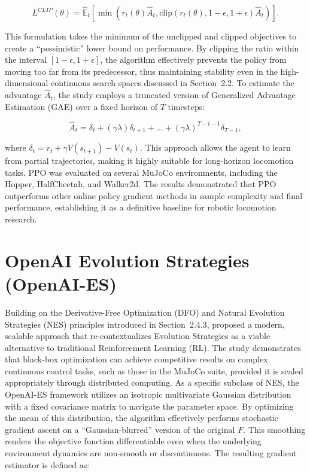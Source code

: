 \begin{equation}
L^{CLIP}(\theta) = \hat{\mathbb{E}}_t [ \min(r_t(\theta) \hat{A}_t, \text{clip}(r_t(\theta), 1 - \epsilon, 1 + \epsilon) \hat{A}_t) ].
\end{equation}

This formulation takes the minimum of the unclipped and clipped objectives to create a ``pessimistic'' lower bound on performance. By clipping the ratio within the interval $[1-\epsilon, 1+\epsilon]$, the algorithm effectively prevents the policy from moving too far from its predecessor, thus maintaining stability even in the high-dimensional continuous search spaces discussed in Section~2.2. To estimate the advantage $\hat{A}_t$, the study employs a truncated version of Generalized Advantage Estimation (GAE) over a fixed horizon of $T$ timesteps:

\begin{equation}
\hat{A}_t = \delta_t + (\gamma\lambda)\delta_{t+1} + \dots + (\gamma\lambda)^{T-t-1}\delta_{T-1},
\end{equation}

where $\delta_t = r_t + \gamma V(s_{t+1}) - V(s_t)$. This approach allows the agent to learn from partial trajectories, making it highly suitable for long-horizon locomotion tasks. PPO was evaluated on several MuJoCo environments, including the Hopper, HalfCheetah, and Walker2d. The results demonstrated that PPO outperforms other online policy gradient methods in sample complexity and final performance, establishing it as a definitive baseline for robotic locomotion research.

\section{OpenAI Evolution Strategies (OpenAI-ES)}

Building on the Derivative-Free Optimization (DFO) \citep{kolda2003directsearch} and Natural Evolution Strategies (NES) \citep{wierstra2014nes} principles introduced in Section~2.4.3, \citep{salimans2017es} proposed a modern, scalable approach that re-contextualizes Evolution Strategies as a viable alternative to traditional Reinforcement Learning (RL). The study demonstrates that black-box optimization can achieve competitive results on complex continuous control tasks, such as those in the MuJoCo suite, provided it is scaled appropriately through distributed computing. As a specific subclass of NES, the OpenAI-ES framework utilizes an isotropic multivariate Gaussian distribution with a fixed covariance matrix to navigate the parameter space. By optimizing the mean of this distribution, the algorithm effectively performs stochastic gradient ascent on a ``Gaussian-blurred'' version of the original  $F$. This smoothing renders the objective function differentiable even when the underlying environment dynamics are non-smooth or discontinuous. The resulting gradient estimator is defined as:

